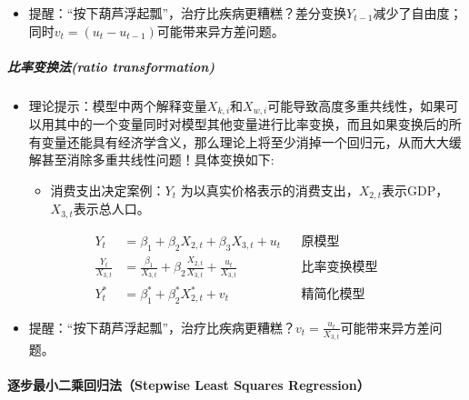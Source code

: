 \documentclass[12pt,(landscape,a4paper),(portrait,a4paper)]{article}
\providecommand{\tightlist}{%
  \setlength{\itemsep}{0pt}\setlength{\parskip}{0pt}}
\let\oldparagraph\paragraph
\renewcommand{\paragraph}[1]{\oldparagraph{#1}\mbox{}}
\let\oldsubparagraph\subparagraph
\renewcommand{\subparagraph}[1]{\oldsubparagraph{#1}\mbox{}}
\begin{document}
\begin{itemize}
\tightlist
\item
  提醒：``按下葫芦浮起瓢''，治疗比疾病更糟糕？差分变换\(Y_{t-1}\)减少了自由度；同时\(v_t=(u_t-u_{t-1})\)可能带来异方差问题。
\end{itemize}

\hypertarget{ratio-transformation}{%
\subparagraph{比率变换法(ratio
transformation)}\label{ratio-transformation}}

\begin{itemize}
\tightlist
\item
  理论提示：模型中两个解释变量\(X_{k,i}\)和\(X_{w,i}\)可能导致高度多重共线性，如果可以用其中的一个变量同时对模型其他变量进行比率变换，而且如果变换后的所有变量还能具有经济学含义，那么理论上将至少消掉一个回归元，从而大大缓解甚至消除多重共线性问题！具体变换如下:

  \begin{itemize}
  \tightlist
  \item
    消费支出决定案例：\(Y_t\)
    为以真实价格表示的消费支出，\(X_{2,t}\)表示GDP，
    \(X_{3,t}\)表示总人口。
  \end{itemize}
\end{itemize}

\begin{align}
Y_t & =\beta_1+\beta_2X_{2,t}+\beta_3X_{3,t}+u_t && \text{原模型} \label{eq:trans0} \\
\frac{Y_t}{X_{3,t}} & =\frac{\beta_1}{X_{3,t}}+\beta_2\frac{X_{2,t}}{X_{3,t}}+\frac{u_t}{X_{3,t}} && \text{比率变换模型} \label{eq:trans} \\
Y^{\ast}_t &=\beta^{\ast}_1+\beta^{\ast}_2X^{\ast}_{2,t}+v_t && \text{精简化模型} \label{eq:trans-new}
\end{align}

\begin{itemize}
\tightlist
\item
  提醒：``按下葫芦浮起瓢''，治疗比疾病更糟糕？\(v_t=\frac{u_t}{X_{3,t}}\)可能带来异方差问题。
\end{itemize}

\hypertarget{stepwise-least-squares-regression}{%
\paragraph{逐步最小二乘回归法（Stepwise Least Squares
Regression）}\label{stepwise-least-squares-regression}}
\end{document}
